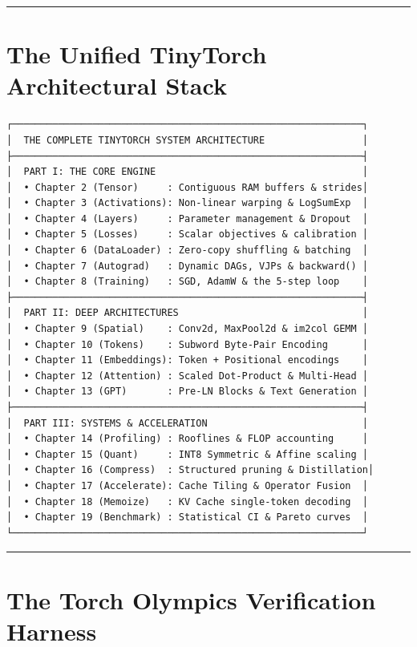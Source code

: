 \documentclass[
  letterpaper,
]{scrbook}
\begin{document}
\begin{center}\rule{0.5\linewidth}{0.5pt}\end{center}

\section{The Unified TinyTorch Architectural
Stack}\label{the-unified-tinytorch-architectural-stack}

\begin{verbatim}
┌─────────────────────────────────────────────────────────────┐
│  THE COMPLETE TINYTORCH SYSTEM ARCHITECTURE                 │
├─────────────────────────────────────────────────────────────┤
│  PART I: THE CORE ENGINE                                    │
│  • Chapter 2 (Tensor)     : Contiguous RAM buffers & strides│
│  • Chapter 3 (Activations): Non-linear warping & LogSumExp  │
│  • Chapter 4 (Layers)     : Parameter management & Dropout  │
│  • Chapter 5 (Losses)     : Scalar objectives & calibration │
│  • Chapter 6 (DataLoader) : Zero-copy shuffling & batching  │
│  • Chapter 7 (Autograd)   : Dynamic DAGs, VJPs & backward() │
│  • Chapter 8 (Training)   : SGD, AdamW & the 5-step loop    │
├─────────────────────────────────────────────────────────────┤
│  PART II: DEEP ARCHITECTURES                                │
│  • Chapter 9 (Spatial)    : Conv2d, MaxPool2d & im2col GEMM │
│  • Chapter 10 (Tokens)    : Subword Byte-Pair Encoding      │
│  • Chapter 11 (Embeddings): Token + Positional encodings    │
│  • Chapter 12 (Attention) : Scaled Dot-Product & Multi-Head │
│  • Chapter 13 (GPT)       : Pre-LN Blocks & Text Generation │
├─────────────────────────────────────────────────────────────┤
│  PART III: SYSTEMS & ACCELERATION                           │
│  • Chapter 14 (Profiling) : Rooflines & FLOP accounting     │
│  • Chapter 15 (Quant)     : INT8 Symmetric & Affine scaling │
│  • Chapter 16 (Compress)  : Structured pruning & Distillation│
│  • Chapter 17 (Accelerate): Cache Tiling & Operator Fusion  │
│  • Chapter 18 (Memoize)   : KV Cache single-token decoding  │
│  • Chapter 19 (Benchmark) : Statistical CI & Pareto curves  │
└─────────────────────────────────────────────────────────────┘
\end{verbatim}

\begin{center}\rule{0.5\linewidth}{0.5pt}\end{center}

\section{The Torch Olympics Verification
Harness}\label{the-torch-olympics-verification-harness}
\end{document}
